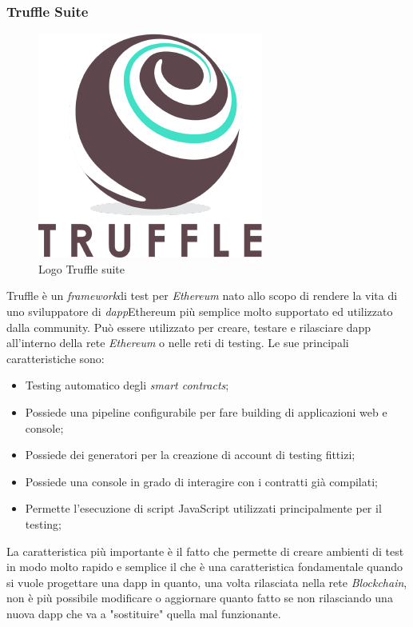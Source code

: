 \subsubsection{Truffle Suite}
\begin{figure}[h]
	\centering
	\includegraphics[scale=0.3]{immagini/truffle}
	\caption{Logo Truffle suite}
\end{figure}
Truffle è un \emph{\gls{framework}}\glsfirstoccur di test per \textit{Ethereum} nato allo scopo di rendere la vita di uno sviluppatore di \emph{\gls{dapp}}\glsfirstoccur Ethereum più semplice molto supportato ed utilizzato dalla community.
Può essere utilizzato per creare, testare e rilasciare \gls{dapp} all'interno della rete \textit{Ethereum} o nelle reti di testing\cite{truffle}.
Le sue principali caratteristiche sono:
\begin{itemize}
	\item Testing automatico degli \textit{smart contracts};
	\item Possiede una pipeline configurabile per fare building di applicazioni web e console;
	\item Possiede dei generatori per la creazione di account di testing fittizi;
	\item Possiede una console in grado di interagire con i contratti già compilati;
	\item Permette l'esecuzione di script JavaScript utilizzati principalmente per il testing;
\end{itemize}
La caratteristica più importante è il fatto che permette di creare ambienti di test in modo molto rapido e semplice il che è una caratteristica fondamentale quando si vuole progettare una \gls{dapp} in quanto, una volta rilasciata nella rete \textit{Blockchain}, non è più possibile modificare o aggiornare quanto fatto se non rilasciando una nuova \gls{dapp} che va a "sostituire" quella mal funzionante\cite{truffle}.
